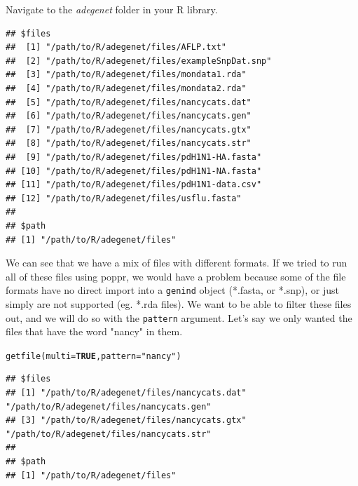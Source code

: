 \documentclass[letterpaper]{article}\usepackage[]{graphicx}\usepackage[]{color}
\makeatletter
\newcommand{\hlnum}[1]{\textcolor[rgb]{0.502,0,0.502}{\textbf{#1}}}%
\newcommand{\hlstr}[1]{\textcolor[rgb]{0.651,0.522,0}{#1}}%
\newcommand{\hlstd}[1]{\textcolor[rgb]{0,0,0}{#1}}%
\newcommand{\hlkwc}[1]{\textcolor[rgb]{0,0.502,0.753}{#1}}%
\newcommand{\hlkwd}[1]{\textcolor[rgb]{0,0.267,0.4}{#1}}%
\newenvironment{kframe}{%
 \def\at@end@of@kframe{}%
 \ifinner\ifhmode%
  \def\at@end@of@kframe{\end{minipage}}%
  \begin{minipage}{\columnwidth}%
 \fi\fi%
 \def\FrameCommand##1{\hskip\@totalleftmargin \hskip-\fboxsep
 \colorbox{shadecolor}{##1}\hskip-\fboxsep
     \hskip-\linewidth \hskip-\@totalleftmargin \hskip\columnwidth}%
 \MakeFramed {\advance\hsize-\width
   \@totalleftmargin\z@ \linewidth\hsize
   \@setminipage}}%
 {\par\unskip\endMakeFramed%
 \at@end@of@kframe}
\newenvironment{knitrout}{}{} %
\newcommand{\adegenet}{\textit{adegenet}}
\makeatother
\begin{document}
Navigate to the \adegenet{} folder in your R library.
\begin{knitrout}\footnotesize
{}\color{fgcolor}\begin{kframe}
\begin{verbatim}
## $files
##  [1] "/path/to/R/adegenet/files/AFLP.txt"         
##  [2] "/path/to/R/adegenet/files/exampleSnpDat.snp"
##  [3] "/path/to/R/adegenet/files/mondata1.rda"     
##  [4] "/path/to/R/adegenet/files/mondata2.rda"     
##  [5] "/path/to/R/adegenet/files/nancycats.dat"    
##  [6] "/path/to/R/adegenet/files/nancycats.gen"    
##  [7] "/path/to/R/adegenet/files/nancycats.gtx"    
##  [8] "/path/to/R/adegenet/files/nancycats.str"    
##  [9] "/path/to/R/adegenet/files/pdH1N1-HA.fasta"  
## [10] "/path/to/R/adegenet/files/pdH1N1-NA.fasta"  
## [11] "/path/to/R/adegenet/files/pdH1N1-data.csv"  
## [12] "/path/to/R/adegenet/files/usflu.fasta"      
## 
## $path
## [1] "/path/to/R/adegenet/files"
\end{verbatim}
\end{kframe}
\end{knitrout}


We can see that we have a mix of files with different formats. If we tried to run all of these files using poppr, we would have a problem because some of the file formats have no direct import into a \texttt{genind} object (*.fasta, or *.snp), or just simply are not supported (eg. *.rda files). We want to be able to filter these files out, and we will do so with the \texttt{pattern} argument. Let's say we only wanted the files that have the word "nancy" in them.
\begin{knitrout}\footnotesize
{}\color{fgcolor}\begin{kframe}
\begin{alltt}
\hlkwd{getfile}\hlstd{(}\hlkwc{multi} \hlstd{=} \hlnum{TRUE}\hlstd{,} \hlkwc{pattern} \hlstd{=} \hlstr{"nancy"}\hlstd{)}
\end{alltt}
\end{kframe}
\end{knitrout}

\begin{knitrout}\footnotesize
{}\color{fgcolor}\begin{kframe}
\begin{verbatim}
## $files
## [1] "/path/to/R/adegenet/files/nancycats.dat" "/path/to/R/adegenet/files/nancycats.gen"
## [3] "/path/to/R/adegenet/files/nancycats.gtx" "/path/to/R/adegenet/files/nancycats.str"
## 
## $path
## [1] "/path/to/R/adegenet/files"
\end{verbatim}
\end{kframe}
\end{knitrout}
\end{document}

